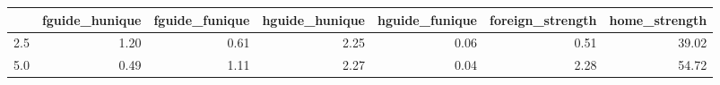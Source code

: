\begin{tabular}{lrrrrrr}
\toprule
 & fguide_hunique & fguide_funique & hguide_hunique & hguide_funique & foreign_strength & home_strength \\
\midrule
2.5 & 1.20 & 0.61 & 2.25 & 0.06 & 0.51 & 39.02 \\
5.0 & 0.49 & 1.11 & 2.27 & 0.04 & 2.28 & 54.72 \\
\bottomrule
\end{tabular}
